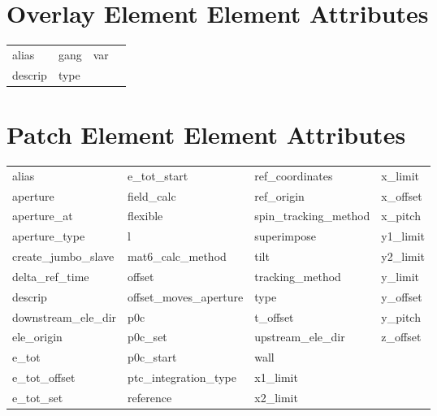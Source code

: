  \vfill
 
 \section{Overlay Element Element Attributes}
 \label{s:list.overlay}
 
 \begin{tabular}{llll} \toprule
alias                       & gang                        & var                         &                             \\
descrip                     & type                        &                             &                             \\
 \bottomrule
 \end{tabular}
 \vfill
 
 \section{Patch Element Element Attributes}
 \label{s:list.patch}
 
 \begin{tabular}{llll} \toprule
alias                       & e_tot_start                 & ref_coordinates             & x_limit                     \\
aperture                    & field_calc                  & ref_origin                  & x_offset                    \\
aperture_at                 & flexible                    & spin_tracking_method        & x_pitch                     \\
aperture_type               & l                           & superimpose                 & y1_limit                    \\
create_jumbo_slave          & mat6_calc_method            & tilt                        & y2_limit                    \\
delta_ref_time              & offset                      & tracking_method             & y_limit                     \\
descrip                     & offset_moves_aperture       & type                        & y_offset                    \\
downstream_ele_dir          & p0c                         & t_offset                    & y_pitch                     \\
ele_origin                  & p0c_set                     & upstream_ele_dir            & z_offset                    \\
e_tot                       & p0c_start                   & wall                        &                             \\
e_tot_offset                & ptc_integration_type        & x1_limit                    &                             \\
e_tot_set                   & reference                   & x2_limit                    &                             \\
 \bottomrule
 \end{tabular}
 \vfill
 

